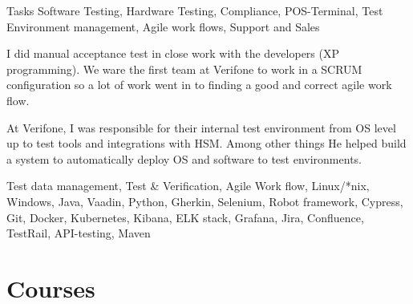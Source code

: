 \documentclass{sobCV}[2015/09/08]
\begin{document}
   {Tasks}{
       Software Testing,
       Hardware Testing,
       Compliance, 
       POS-Terminal,
       Test Environment management,
       Agile work flows,
       Support and Sales
 }{  %
      {
          I did manual acceptance test in close work with the developers (XP
          programming). We ware the first team at Verifone to work in a SCRUM
          configuration so a lot of work went in to finding a good and correct
          agile work flow.

          At Verifone, I was responsible for their internal test environment
          from OS level up to test tools and integrations with HSM. Among other
          things He helped build a system to automatically deploy OS and
          software to test environments.
     }
 }{
       Test data management,
       Test \& Verification,
       Agile Work flow, 
       Linux/*nix, 
       Windows, 
       Java, 
       Vaadin, 
       Python, 
       Gherkin, 
       Selenium, 
       Robot framework,
       Cypress, 
       Git, 
       Docker, 
       Kubernetes, 
       Kibana, 
       ELK stack, 
       Grafana, 
       Jira, 
       Confluence, 
       TestRail, 
       API-testing, 
       Maven 
}
   \section{Courses}
   


\end{document}
